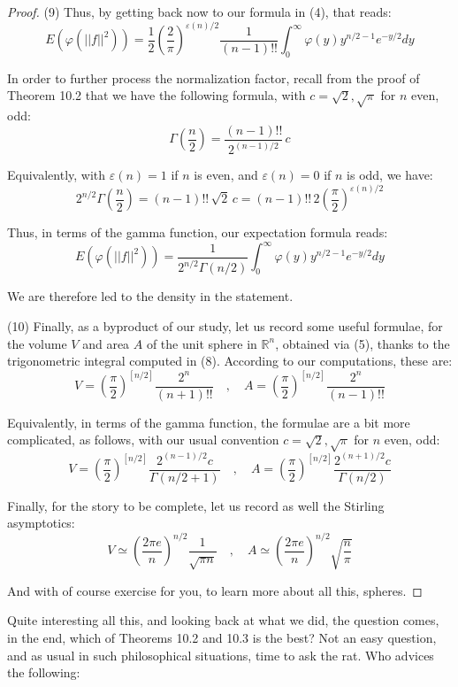\documentclass[12pt]{amsbook}
\begin{document}
\begin{proof}
(9) Thus, by getting back now to our formula in (4), that reads:
$$E\left(\varphi(||f||^2)\right)
=\frac{1}{2}\left(\frac{2}{\pi}\right)^{\varepsilon(n)/2}\frac{1}{(n-1)!!}\int_0^\infty\varphi(y)y^{n/2-1}e^{-y/2}dy$$

In order to further process the normalization factor, recall from the proof of Theorem 10.2 that we have the following formula, with $c=\sqrt{2},\sqrt{\pi}$ for $n$ even, odd:
$$\Gamma\left(\frac{n}{2}\right)=\frac{(n-1)!!}{2^{(n-1)/2}}\,c$$

Equivalently, with $\varepsilon(n)=1$ if $n$ is even, and $\varepsilon(n)=0$ if $n$ is odd, we have:
$$2^{n/2}\Gamma\left(\frac{n}{2}\right)=(n-1)!!\,\sqrt{2}\,c=(n-1)!!\,2\left(\frac{\pi}{2}\right)^{\varepsilon(n)/2}$$

Thus, in terms of the gamma function, our expectation formula reads:
$$E\left(\varphi(||f||^2)\right)=\frac{1}{2^{n/2}\Gamma(n/2)}\int_0^\infty\varphi(y)y^{n/2-1}e^{-y/2}dy$$

We are therefore led to the density in the statement.

\medskip

(10) Finally, as a byproduct of our study, let us record some useful formulae, for the volume $V$ and area $A$ of the unit sphere in $\mathbb R^n$, obtained via (5), thanks to the trigonometric integral computed in (8). According to our computations, these are:
$$V=\left(\frac{\pi}{2}\right)^{[n/2]}\frac{2^n}{(n+1)!!}\quad,\quad 
A=\left(\frac{\pi}{2}\right)^{[n/2]}\frac{2^n}{(n-1)!!}$$

Equivalently, in terms of the gamma function, the formulae are a bit more complicated, as follows, with our usual convention $c=\sqrt{2},\sqrt{\pi}$ for $n$ even, odd:
$$V=\left(\frac{\pi}{2}\right)^{[n/2]}\frac{2^{(n-1)/2}c}{\Gamma(n/2+1)}\quad,\quad 
A=\left(\frac{\pi}{2}\right)^{[n/2]}\frac{2^{(n+1)/2}c}{\Gamma(n/2)}$$

Finally, for the story to be complete, let us record as well the Stirling asymptotics:
$$V\simeq\left(\frac{2\pi e}{n}\right)^{n/2}\frac{1}{\sqrt{\pi n}}
\quad,\quad A\simeq\left(\frac{2\pi e}{n}\right)^{n/2}\sqrt{\frac{n}{\pi}}$$

And with of course exercise for you, to learn more about all this, spheres.
\end{proof}

Quite interesting all this, and looking back at what we did, the question comes, in the end, which of Theorems 10.2 and 10.3 is the best? Not an easy question, and as usual in such philosophical situations, time to ask the rat. Who advices the following:
\end{document}
